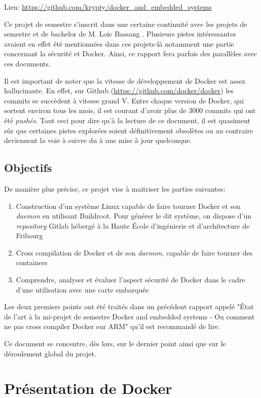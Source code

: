 \documentclass[11pt,a4paper,oneside]{report}
\newcommand{\school}{Haute École d'ingénierie et d'architecture de Fribourg}
\newcommand{\oldreportname}{État de l’art à la mi-projet de semestre Docker and embedded systems - Ou comment ne pas cross compiler Docker sur ARM}
\begin{document}
Lien: \url{https://github.com/krypty/docker_and_embedded_systems}

Ce projet de semestre s'inscrit dans une certaine continuité avec les projets de semestre et de bachelor de M. Loic Bassang \cite{bassang_bachelor}. Plusieurs pistes intéressantes avaient en effet été mentionnées dans ces projets-là notamment une partie concernant la sécurité et Docker. Ainsi, ce rapport fera parfois des parallèles avec ces documents.

Il est important de noter que la vitesse de développement de Docker est assez hallucinante. En effet, sur Github (\url{https://github.com/docker/docker}) les commits se succèdent à vitesse grand V. Entre chaque version de Docker, qui sortent environ tous les mois, il est courant d'avoir plus de 3000 commits qui ont été \emph{pushés}. Tout ceci pour dire qu'à la lecture de ce document, il est quasiment sûr que certaines pistes explorées soient définitivement obsolètes ou au contraire deviennent la voie à suivre du à une mise à jour quelconque.


\section{Objectifs}

De manière plus précise, ce projet vise à maitriser les parties suivantes:

\begin{enumerate}
  \item Construction d'un système Linux capable de faire tourner Docker et son \emph{daemon} en utilisant Buildroot. Pour générer le dit système, on dispose d'un \emph{repository} Gitlab hébergé à la \school

  \item Cross compilation de Docker et de son \emph{daemon}, capable de faire tourner des containers

  \item Comprendre, analyser et évaluer l'aspect sécurité de Docker dans le cadre d'une utilisation avec une carte embarquée
\end{enumerate}

Les deux premiers points ont été traités dans un précédent rapport appelé "\oldreportname" qu'il est recommandé de lire.

Ce document se concentre, dès lors, sur le dernier point ainsi que sur le déroulement global du projet.


\chapter{Présentation de Docker}
\end{document}
